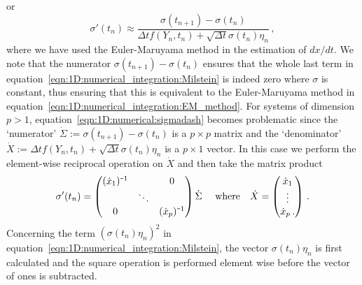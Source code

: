 {{\begin{equation}
		\end{equation}
	or 
		\begin{equation}
			\sigma'(t_n) \approx \frac{\sigma(t_{n+1})- \sigma(t_n)}{\Delta t f(Y_n,t_n) + \sqrt{\Delta t}\sigma(t_n)\eta_n}\,,
		\end{equation}
	where we have used the Euler-Maruyama method in the estimation of $dx/dt$. We note that the numerator $\sigma(t_{n+1})- \sigma(t_n)$ ensures that the whole last term in equation~\ref{eqn:1D:numerical_integration:Milstein} is indeed zero where $\sigma$ is constant, thus ensuring that this is equivalent to the Euler-Maruyama method in equation~\ref{eqn:1D:numerical_integration:EM_method}. For systems of dimension $p>1$, equation~\ref{eqn:1D:numerical:sigmadash} becomes problematic since the `numerator' $\dot{\Sigma} := \sigma(t_{n+1})- \sigma(t_n)$ is a $p\times p$ matrix and the `denominator' $\dot{X} := \Delta t f(Y_n,t_n) + \sqrt{\Delta t}\sigma(t_n)\eta_n$ is a $p\times 1$ vector. In this case we perform the element-wise reciprocal operation on $\dot{X}$ and then take the matrix product	
	\begin{equation}
	\sigma'(t_n) = \begin{pmatrix}
	(\dot{x}_1)^{\textup{\texttt{-}}1} &  & 0\\
	  & \ddots & \\
	0  &  & (\dot{x}_p)^{\textup{\texttt{-}}1}
	\end{pmatrix} \dot{\Sigma}~~~~\text{where}~~~\dot{X} = \begin{pmatrix}
	\dot{x}_1\\
	\vdots\\
	\dot{x}_p\,.
	\end{pmatrix}\,.
	\end{equation}
	Concerning the term $(\sigma(t_n) \eta_n)^2$ in equation~\ref{eqn:1D:numerical_integration:Milstein}, the vector $\sigma(t_n) \eta_n$ is first calculated and the square operation is performed element wise before the vector of ones is subtracted. 
	
}}
